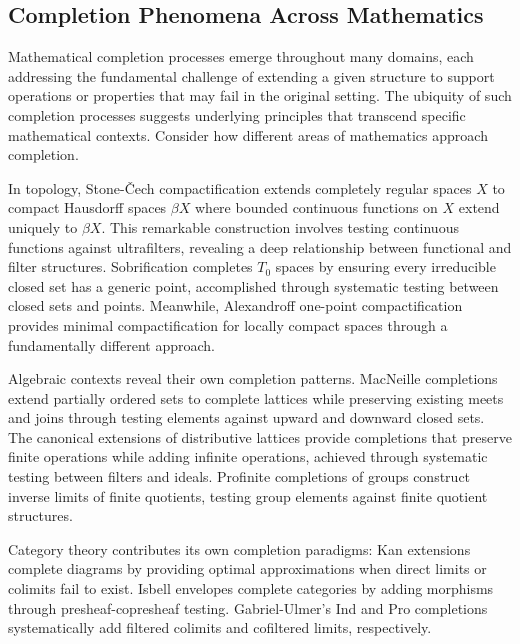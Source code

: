 \documentclass[11pt]{article}
\theoremstyle{plain}
\theoremstyle{definition}
\theoremstyle{remark}
\begin{document}
\subsection{Completion Phenomena Across Mathematics}

Mathematical completion processes emerge throughout many domains, each addressing the fundamental challenge of extending a given structure to support operations or properties that may fail in the original setting. The ubiquity of such completion processes suggests underlying principles that transcend specific mathematical contexts. Consider how different areas of mathematics approach completion.

In topology, Stone-\v{C}ech compactification \cite{stone1936theory} extends completely regular spaces $X$ to compact Hausdorff spaces $\beta X$ where bounded continuous functions on $X$ extend uniquely to $\beta X$. This remarkable construction involves testing continuous functions against ultrafilters, revealing a deep relationship between functional and filter structures. Sobrification \cite{johnstone1982stone} completes $T_0$ spaces by ensuring every irreducible closed set has a generic point, accomplished through systematic testing between closed sets and points. Meanwhile, Alexandroff one-point compactification \cite{alexandroff1924point} provides minimal compactification for locally compact spaces through a fundamentally different approach.

Algebraic contexts reveal their own completion patterns. MacNeille completions \cite{macneille1937extension} extend partially ordered sets to complete lattices while preserving existing meets and joins through testing elements against upward and downward closed sets. The canonical extensions of distributive lattices \cite{jonsson1951boolean,gehrke2001bounded} provide completions that preserve finite operations while adding infinite operations, achieved through systematic testing between filters and ideals. Profinite completions of groups \cite{pontryagin1966topological} construct inverse limits of finite quotients, testing group elements against finite quotient structures.

Category theory contributes its own completion paradigms: Kan extensions \cite{kan1958adjoint} complete diagrams by providing optimal approximations when direct limits or colimits fail to exist. Isbell envelopes \cite{isbell1960adequate,garner2018isbell} complete categories by adding morphisms through presheaf-copresheaf testing. Gabriel-Ulmer's Ind and Pro completions \cite{gabriel1971lokal,adamek1994locally} systematically add filtered colimits and cofiltered limits, respectively.
\end{document}

